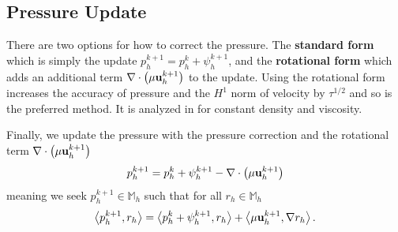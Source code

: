 \documentclass[letterpaper]{erdc}
\begin{document}
\subsection{Pressure Update}\label{sec:bdf2pressureupdate}
\begin{remark}
  There are two options for how to correct the pressure.  The \textbf{standard
    form} which is simply the update $p_h^{k+1} = p_h^{k} + \psi_h^{k+1}$, and
  the \textbf{rotational form} which adds an additional term
  $\nabla\cdot\left(\mu\textbf{u}^{k+1}_h\right)$ to the update.  Using the rotational
  form increases the accuracy of pressure and the $H^1$ norm of velocity by
  $\tau^{1/2}$ and so is the preferred method.  It is analyzed in
  \cite{guermond2004error} for constant density and viscosity.
\end{remark}
Finally, we update the pressure with the pressure correction and the rotational
term $\nabla\cdot\left(\mu\textbf{u}^{k+1}_h\right)$
\begin{equation}
  p_h^{k+1} = p_h^{k} + \psi_h^{k+1} - \nabla\cdot\left(\mu\textbf{u}^{k+1}_h\right)
\end{equation}
meaning we seek $p_h^{k+1}\in \mathbb{M}_h$ such that for all
$r_h\in \mathbb{M}_h$
\begin{equation}
  \left\langle p_h^{k+1}, r_h \right\rangle = \left\langle p_h^{k} + \psi_h^{k+1}, r_h \right\rangle + \left\langle \mu\textbf{u}_h^{k+1}, \nabla r_h \right\rangle.
\end{equation}
\end{document}
